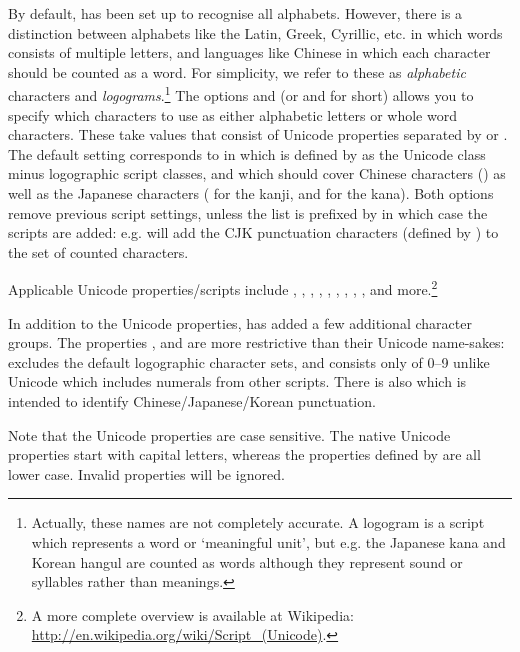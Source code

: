 \documentclass{article}
\begin{document}
By default, \TeXcount{} has been set up to recognise all alphabets. However, there is a distinction between alphabets like the Latin, Greek, Cyrillic, etc. in which words consists of multiple letters, and languages like Chinese in which each character should be counted as a word. For simplicity, we refer to these as \emph{alphabetic} characters and \emph{logograms}.\footnote{%
Actually, these names are not completely accurate. A logogram is a script which represents a word or `meaningful unit', but e.g. the Japanese kana and Korean hangul are counted as words although they represent sound or syllables rather than meanings.}
The options  and  (or  and  for short) allows you to specify which characters to use as either alphabetic letters or whole word characters. These take values that consist of Unicode properties separated by \code{,} or \code{+}. The default setting corresponds to
in which  is defined by \TeXcount{} as the Unicode  class minus logographic script classes, and
which should cover Chinese characters () as well as the Japanese characters ( for the kanji,  and  for the kana). Both options remove previous script settings, unless the list is prefixed by \code{+} in which case the scripts are added: e.g.  will add the CJK punctuation characters (defined by \TeXcount) to the set of counted characters.

Applicable Unicode properties/scripts include , , , , , , , , , and more.\footnote{A more complete overview is available at Wikipedia: \url{http://en.wikipedia.org/wiki/Script_(Unicode)}.}

In addition to the Unicode properties, \TeXcount{} has added a few additional character groups. The properties ,  and  are more restrictive than their Unicode name-sakes:  excludes the default logographic character sets, and  consists only of 0--9 unlike Unicode  which includes numerals from other scripts. There is also  which is intended to identify Chinese/Japanese/Korean punctuation.

Note that the Unicode properties are case sensitive. The native Unicode properties start with capital letters, whereas the properties defined by \TeXcount{} are all lower case. Invalid properties will be ignored.
\end{document}
